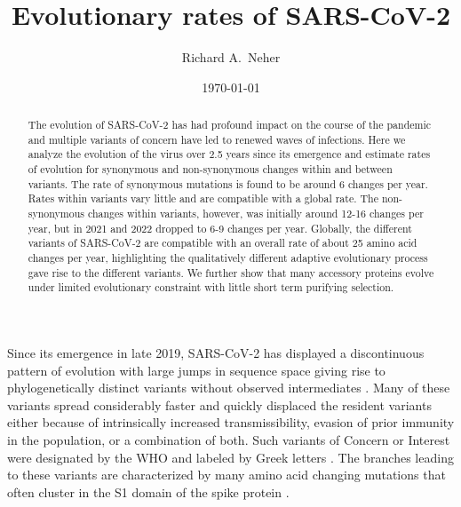 \documentclass[aps,rmp, twocolumn]{revtex4}
\begin{document}
\title{Evolutionary rates of SARS-CoV-2}
\author{Richard A.~Neher}
\date{\today}

\begin{abstract}
The evolution of SARS-CoV-2 has had profound impact on the course of the pandemic and multiple variants of concern have led to renewed waves of infections.
Here we analyze the evolution of the virus over 2.5 years since its emergence and estimate rates of evolution for synonymous and non-synonymous changes within and between variants.
The rate of synonymous mutations is found to be around 6 changes per year.
Rates within variants vary little and are compatible with a global rate.
The non-synonymous changes within variants, however, was initially around 12-16 changes per year, but in 2021 and 2022 dropped to 6-9 changes per year.
Globally, the different variants of SARS-CoV-2 are compatible with an overall rate of about 25 amino acid changes per year, highlighting the qualitatively different adaptive evolutionary process gave rise to the different variants.
We further show that many accessory proteins evolve under limited evolutionary constraint with little short term purifying selection.
\end{abstract}

\maketitle

Since its emergence in late 2019, SARS-CoV-2 has displayed a discontinuous pattern of evolution with large jumps in sequence space giving rise to phylogenetically distinct variants without observed intermediates \citep{hodcroft_spread_2021,volz_assessing_2021,tegally_detection_2021,faria_genomics_2021,naveca_covid-19_2021,viana_rapid_2022}.
Many of these variants spread considerably faster and quickly displaced the resident variants either because of intrinsically increased transmissibility, evasion of prior immunity in the population, or a combination of both.
Such variants of Concern or Interest were designated by the WHO and labeled by Greek letters \citep{konings_sars-cov-2_2021}.
The branches leading to these variants are characterized by many amino acid changing mutations that often cluster in the S1 domain of the spike protein \citep{kistler_rapid_2022}.
\end{document}
